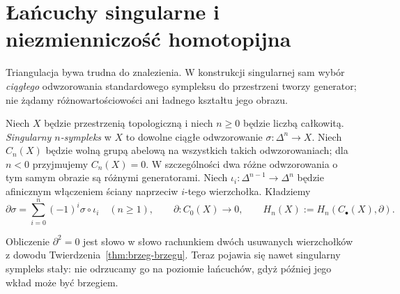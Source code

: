 \section{Łańcuchy singularne i niezmienniczość homotopijna}
\label{sec:homologia-singularna}

Triangulacja bywa trudna do znalezienia. W konstrukcji
singularnej sam wybór \emph{ciągłego} odwzorowania
standardowego sympleksu do przestrzeni tworzy
generator; nie żądamy różnowartościowości ani
ładnego kształtu jego obrazu.

\begin{definicja}
\label{def:homologia-singularna}
Niech $X$ będzie przestrzenią topologiczną
i niech $n\geq0$ będzie liczbą całkowitą.
\emph{Singularny $n$-sympleks} w $X$ to dowolne
ciągłe odwzorowanie $\sigma:\Delta^n\to X$.
Niech $C_n(X)$ będzie wolną grupą abelową
na wszystkich takich odwzorowaniach; dla $n<0$ przyjmujemy $C_n(X)=0$.
W szczególności
dwa różne odwzorowania o tym samym obrazie są
różnymi generatorami. Niech
$\iota_i:\Delta^{n-1}\to\Delta^n$
będzie afinicznym włączeniem ściany
naprzeciw $i$-tego wierzchołka. Kładziemy
\begin{equation}\label{eq:singular-boundary}
 \partial\sigma=\sum_{i=0}^n(-1)^i
 \sigma\circ\iota_i\quad(n\geq1),
 \qquad \partial:C_0(X)\to0,
 \qquad H_n(X):=H_n(C_\bullet(X),\partial).
\end{equation}
\end{definicja}

Obliczenie $\partial^2=0$ jest słowo w słowo
rachunkiem dwóch usuwanych wierzchołków
z dowodu Twierdzenia~\ref{thm:brzeg-brzegu}.
Teraz pojawia się nawet singularny sympleks
stały: nie odrzucamy go na poziomie
łańcuchów, gdyż później jego wkład może
być brzegiem.

